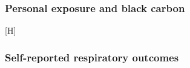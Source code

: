 \documentclass[
  letterpaper,
  DIV=11,
  numbers=noendperiod]{scrartcl}
\makeatletter
\renewenvironment{figure}%
   {\renewcommand\familydefault\sfdefault
    \@float{figure}}
   {\end@float}
\makeatother
\begin{document}
\subsubsection{Personal exposure and black
carbon}\label{personal-exposure-and-black-carbon}

\begin{figure}[H]

\caption{\label{fig-afig-pt-pe-bc}Comparison of pre-intervention trends
in personal exposure and black carbon between waves 1 and 2 for never
treated and villages treated later.}


\end{figure}%

\subsubsection{Self-reported respiratory
outcomes}\label{self-reported-respiratory-outcomes-1}
\end{document}

